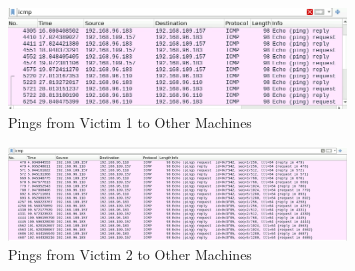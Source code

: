 \begin{figure}[H]
\centering
\includegraphics[width=0.8\textwidth]{img/level1/level1-192-168-96-183.png}
\caption{Pings from Victim 1 to Other Machines}\label{fig:PingVictim1}
\end{figure}

\begin{figure}[H]
\centering
\includegraphics[width=0.8\textwidth]{img/level1/level1-192-168-109-157.png}
\caption{Pings from Victim 2 to Other Machines}\label{fig:PingVictim2}
\end{figure}